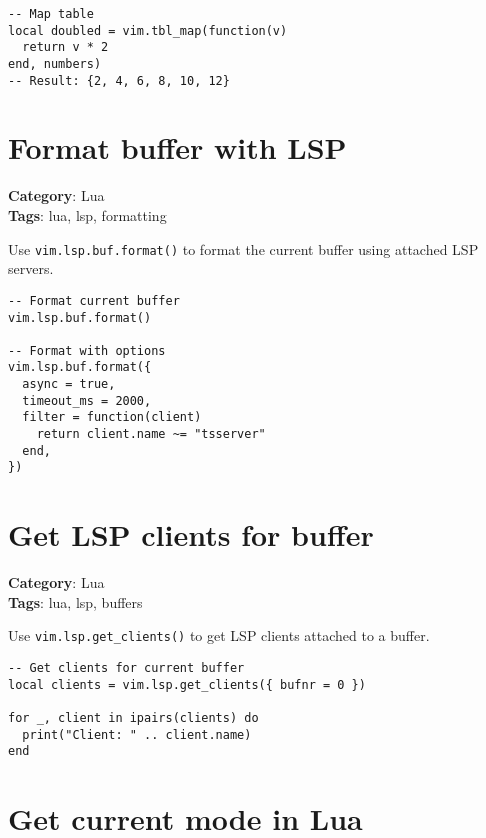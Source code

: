 {{{{{{\begin{Exa*}{}
\begin{Verbatim}[fontsize=\footnotesize, breaklines, breakanywhere]
-- Map table
local doubled = vim.tbl_map(function(v)
  return v * 2
end, numbers)
-- Result: {2, 4, 6, 8, 10, 12}
\end{Verbatim}
\end{Exa*}

\section{Format buffer with LSP}

\textbf{Category}: Lua\\ \textbf{Tags}: lua, lsp, formatting
\vspace{0.5cm}

Use {\footnotesize \Verb§vim.lsp.buf.format()§} to format the current buffer using attached LSP servers.

\begin{Exa*}{}
\begin{Verbatim}[fontsize=\footnotesize, breaklines, breakanywhere]
-- Format current buffer
vim.lsp.buf.format()

-- Format with options
vim.lsp.buf.format({
  async = true,
  timeout_ms = 2000,
  filter = function(client)
    return client.name ~= "tsserver"
  end,
})
\end{Verbatim}
\end{Exa*}

\section{Get LSP clients for buffer}

\textbf{Category}: Lua\\ \textbf{Tags}: lua, lsp, buffers
\vspace{0.5cm}

Use {\footnotesize \Verb§vim.lsp.get_clients()§} to get LSP clients attached to a buffer.

\begin{Exa*}{}
\begin{Verbatim}[fontsize=\footnotesize, breaklines, breakanywhere]
-- Get clients for current buffer
local clients = vim.lsp.get_clients({ bufnr = 0 })

for _, client in ipairs(clients) do
  print("Client: " .. client.name)
end
\end{Verbatim}
\end{Exa*}

\section{Get current mode in Lua}

}}}}}}
